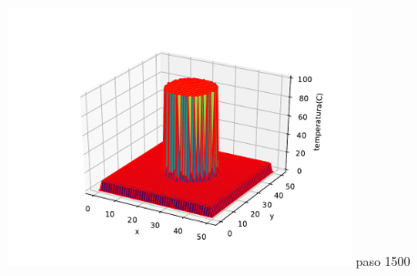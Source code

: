 \documentclass[12pt]{article}
\begin{document}
\begin{centering}
\includegraphics[width=0.75\textwidth]{3d10.pdf}
paso 1500


\end{centering}
\end{document}
